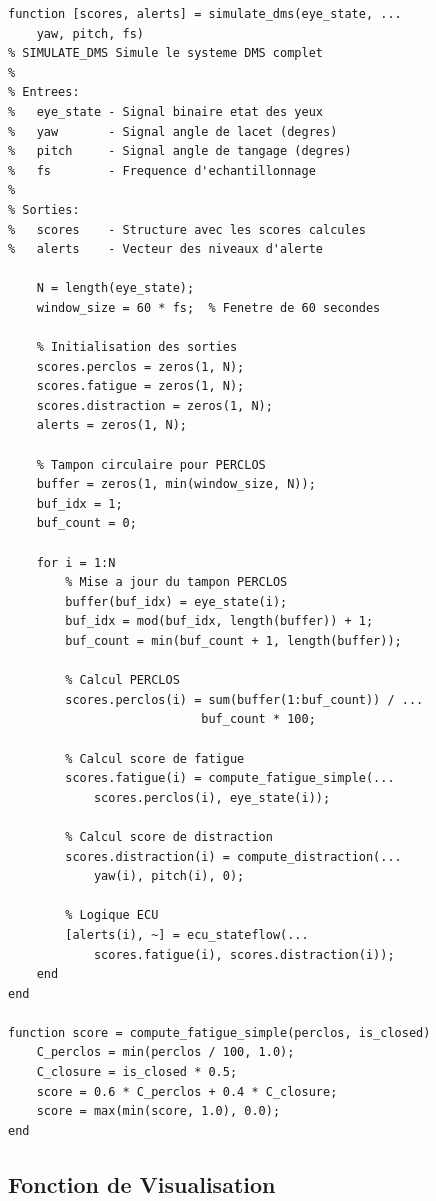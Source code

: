 \begin{lstlisting}[style=matlabstyle, caption={Fonction de simulation DMS.}, label={lst:simulate_dms}]
function [scores, alerts] = simulate_dms(eye_state, ...
    yaw, pitch, fs)
% SIMULATE_DMS Simule le systeme DMS complet
%
% Entrees:
%   eye_state - Signal binaire etat des yeux
%   yaw       - Signal angle de lacet (degres)
%   pitch     - Signal angle de tangage (degres)
%   fs        - Frequence d'echantillonnage
%
% Sorties:
%   scores    - Structure avec les scores calcules
%   alerts    - Vecteur des niveaux d'alerte

    N = length(eye_state);
    window_size = 60 * fs;  % Fenetre de 60 secondes
    
    % Initialisation des sorties
    scores.perclos = zeros(1, N);
    scores.fatigue = zeros(1, N);
    scores.distraction = zeros(1, N);
    alerts = zeros(1, N);
    
    % Tampon circulaire pour PERCLOS
    buffer = zeros(1, min(window_size, N));
    buf_idx = 1;
    buf_count = 0;
    
    for i = 1:N
        % Mise a jour du tampon PERCLOS
        buffer(buf_idx) = eye_state(i);
        buf_idx = mod(buf_idx, length(buffer)) + 1;
        buf_count = min(buf_count + 1, length(buffer));
        
        % Calcul PERCLOS
        scores.perclos(i) = sum(buffer(1:buf_count)) / ...
                           buf_count * 100;
        
        % Calcul score de fatigue
        scores.fatigue(i) = compute_fatigue_simple(...
            scores.perclos(i), eye_state(i));
        
        % Calcul score de distraction
        scores.distraction(i) = compute_distraction(...
            yaw(i), pitch(i), 0);
        
        % Logique ECU
        [alerts(i), ~] = ecu_stateflow(...
            scores.fatigue(i), scores.distraction(i));
    end
end

function score = compute_fatigue_simple(perclos, is_closed)
    C_perclos = min(perclos / 100, 1.0);
    C_closure = is_closed * 0.5;
    score = 0.6 * C_perclos + 0.4 * C_closure;
    score = max(min(score, 1.0), 0.0);
end
\end{lstlisting}

\subsection{Fonction de Visualisation}

